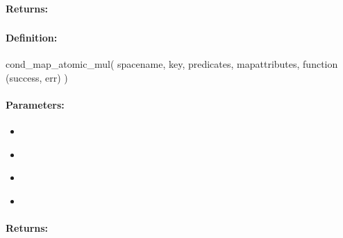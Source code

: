 \paragraph{Returns:}


\pagebreak
\subsubsection{}
\label{api:nodejs:cond_map_atomic_mul}


\paragraph{Definition:}
\begin{javascriptcode}
cond_map_atomic_mul(
        spacename, key, predicates, mapattributes, function (success, err) {})
\end{javascriptcode}
\paragraph{Parameters:}
\begin{itemize}[noitemsep]
\item {}\\

\item {}\\

\item {}\\

\item {}\\

\end{itemize}

\paragraph{Returns:}


\pagebreak
\subsubsection{}
\label{api:nodejs:group_map_atomic_mul}


